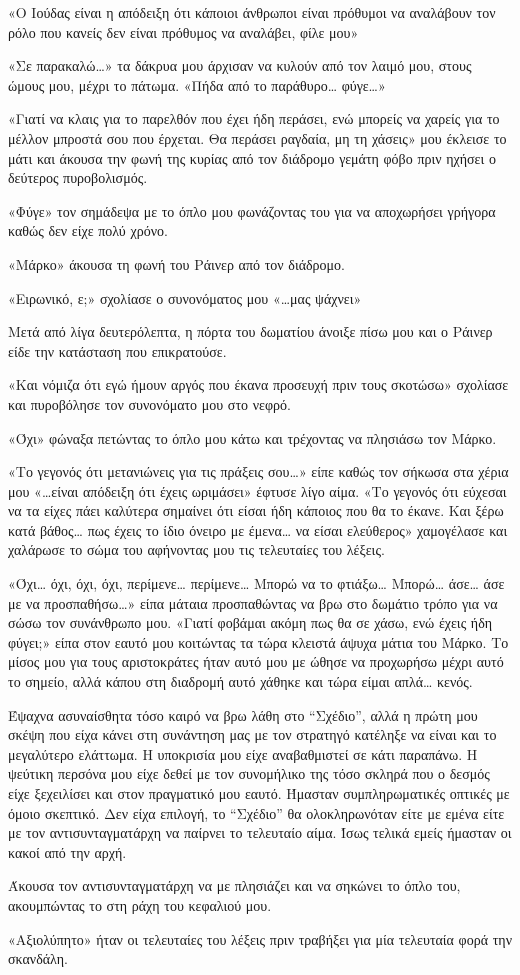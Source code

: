 \documentclass[12pt,twoside, openany]{book}
\begin{document}
«Ο Ιούδας είναι η απόδειξη ότι κάποιοι άνθρωποι είναι πρόθυμοι να αναλάβουν τον ρόλο που κανείς δεν είναι πρόθυμος να αναλάβει, φίλε μου»

«Σε παρακαλώ…» τα δάκρυα μου άρχισαν να κυλούν από τον λαιμό μου, στους ώμους μου, μέχρι το πάτωμα. «Πήδα από το παράθυρο… φύγε…»

«Γιατί να κλαις για το παρελθόν που έχει ήδη περάσει, ενώ μπορείς να χαρείς για το μέλλον μπροστά σου που έρχεται. Θα περάσει ραγδαία, μη τη χάσεις» μου έκλεισε το μάτι και άκουσα την φωνή της κυρίας από τον διάδρομο γεμάτη φόβο πριν ηχήσει ο δεύτερος πυροβολισμός.

«Φύγε» τον σημάδεψα με το όπλο μου φωνάζοντας του για να αποχωρήσει γρήγορα καθώς δεν είχε πολύ χρόνο.

«Μάρκο» άκουσα τη φωνή του Ράινερ από τον διάδρομο.

«Ειρωνικό, ε;» σχολίασε ο συνονόματος μου «…μας ψάχνει»

Μετά από λίγα δευτερόλεπτα, η πόρτα του δωματίου άνοιξε πίσω μου και ο Ράινερ είδε την κατάσταση που επικρατούσε.

«Και νόμιζα ότι εγώ ήμουν αργός που έκανα προσευχή πριν τους σκοτώσω» σχολίασε και πυροβόλησε τον συνονόματο μου στο νεφρό.

«Όχι» φώναξα πετώντας το όπλο μου κάτω και τρέχοντας να πλησιάσω τον Μάρκο.

«Το γεγονός ότι μετανιώνεις για τις πράξεις σου…» είπε καθώς τον σήκωσα στα χέρια μου «…είναι απόδειξη ότι έχεις ωριμάσει» έφτυσε λίγο αίμα. «Το γεγονός ότι εύχεσαι να τα είχες πάει καλύτερα σημαίνει ότι είσαι ήδη κάποιος που θα το έκανε. Και ξέρω κατά βάθος… πως έχεις το ίδιο όνειρο με έμενα… να είσαι ελεύθερος» χαμογέλασε και χαλάρωσε το σώμα του αφήνοντας μου τις τελευταίες του λέξεις.

«Όχι… όχι, όχι, όχι, περίμενε… περίμενε… Μπορώ να το φτιάξω… Μπορώ… άσε… άσε με να προσπαθήσω…» είπα μάταια προσπαθώντας να βρω στο δωμάτιο τρόπο για να σώσω τον συνάνθρωπο μου. «Γιατί φοβάμαι ακόμη πως θα σε χάσω, ενώ έχεις ήδη φύγει;» είπα στον εαυτό μου κοιτώντας τα τώρα κλειστά άψυχα μάτια του Μάρκο. Το μίσος μου για τους αριστοκράτες ήταν αυτό μου με ώθησε να προχωρήσω μέχρι αυτό το σημείο, αλλά κάπου στη διαδρομή αυτό χάθηκε και τώρα είμαι απλά… κενός.

Έψαχνα ασυναίσθητα τόσο καιρό να βρω λάθη στο “Σχέδιο”, αλλά η πρώτη μου σκέψη που είχα κάνει στη συνάντηση μας με τον στρατηγό κατέληξε να είναι και το μεγαλύτερο ελάττωμα. Η υποκρισία μου είχε αναβαθμιστεί σε κάτι παραπάνω. Η ψεύτικη περσόνα μου είχε δεθεί με τον συνομήλικο της τόσο σκληρά που ο δεσμός είχε ξεχειλίσει και στον πραγματικό μου εαυτό. Ήμασταν συμπληρωματικές οπτικές με όμοιο σκεπτικό. Δεν είχα επιλογή, το “Σχέδιο” θα ολοκληρωνόταν είτε με εμένα είτε με τον αντισυνταγματάρχη να παίρνει το τελευταίο αίμα. Ίσως τελικά εμείς ήμασταν οι κακοί από την αρχή.

Άκουσα τον αντισυνταγματάρχη να με πλησιάζει και να σηκώνει το όπλο του, ακουμπώντας το στη ράχη του κεφαλιού μου.

«Αξιολύπητο» ήταν οι τελευταίες του λέξεις πριν τραβήξει για μία τελευταία φορά την σκανδάλη.



\backmatter



\end{document}
